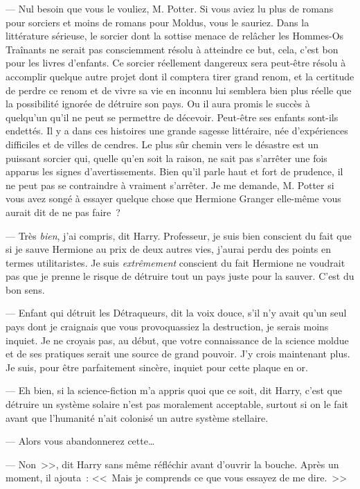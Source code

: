 --- Nul besoin que vous le vouliez, M. Potter. Si vous aviez lu plus de romans pour sorciers et moins de romans pour Moldus, vous le sauriez. Dans la littérature sérieuse, le sorcier dont la sottise menace de relâcher les Hommes-Os Traînants ne serait pas consciemment résolu à atteindre ce but, cela, c'est bon pour les livres d'enfants. Ce sorcier réellement dangereux sera peut-être résolu à accomplir quelque autre projet dont il comptera tirer grand renom, et la certitude de perdre ce renom et de vivre sa vie en inconnu lui semblera bien plus réelle que la possibilité ignorée de détruire son pays. Ou il aura promis le succès à quelqu'un qu'il ne peut se permettre de décevoir. Peut-être ses enfants sont-ils endettés. Il y a dans ces histoires une grande sagesse littéraire, née d'expériences difficiles et de villes de cendres. Le plus sûr chemin vers le désastre est un puissant sorcier qui, quelle qu'en soit la raison, ne sait pas s'arrêter une fois apparus les signes d'avertissements. Bien qu'il parle haut et fort de prudence, il ne peut pas se contraindre à vraiment s'arrêter. Je me demande, M. Potter si vous avez songé à essayer quelque chose que Hermione Granger elle-même vous aurait dit de ne pas faire~?

--- Très \emph{bien}, j'ai compris, dit Harry. Professeur, je suis bien conscient du fait que si je sauve Hermione au prix de deux autres vies, j'aurai perdu des points en termes utilitaristes. Je suis \emph{extrêmement} conscient du fait Hermione ne voudrait pas que je prenne le risque de détruire tout un pays juste pour la sauver. C'est du bon sens.

--- Enfant qui détruit les Détraqueurs, dit la voix douce, s'il n'y avait qu'un seul pays dont je craignais que vous provoquassiez la destruction, je serais moins inquiet. Je ne croyais pas, au début, que votre connaissance de la science moldue et de ses pratiques serait une source de grand pouvoir. J'y crois maintenant plus. Je suis, pour être parfaitement sincère, inquiet pour cette plaque en or.

--- Eh bien, si la science-fiction m'a appris quoi que ce soit, dit Harry, c'est que détruire un système solaire n'est pas moralement acceptable, surtout si on le fait avant que l'humanité n'ait colonisé un autre système stellaire.

--- Alors vous abandonnerez cette…

--- Non~>>, dit Harry sans même réfléchir avant d'ouvrir la bouche. Après un moment, il ajouta~: <<~Mais je comprends ce que vous essayez de me dire.~>>

